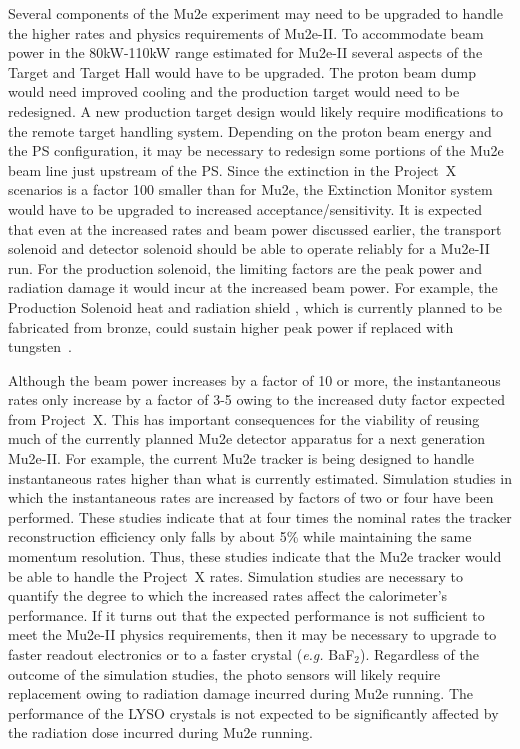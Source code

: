%

Several components of the Mu2e experiment may need to be upgraded to
handle the higher rates and physics requirements of Mu2e-II.  To
accommodate beam power in the 80kW-110kW range estimated for Mu2e-II
several aspects of the Target and Target Hall would have to be
upgraded.  The proton beam dump would need improved cooling and the
production target would need to be redesigned.  A new production
target design would likely require modifications to the remote target
handling system.  Depending on the proton beam energy and the PS
configuration, it may be necessary to redesign some portions of the
Mu2e beam line just upstream of the PS. Since the extinction in the
Project~X scenarios is a factor 100 smaller than for Mu2e, the
Extinction Monitor system would have to be upgraded to increased
acceptance/sensitivity.  It is expected that even at the increased
rates and beam power discussed earlier, the transport solenoid and
detector solenoid should be able to operate reliably for a Mu2e-II
run. For the production solenoid, the limiting factors are the peak
power and radiation damage it would incur at the increased beam power.
For example, the Production Solenoid heat and radiation shield , which
is currently planned to be fabricated from bronze, could sustain
higher peak power if replaced with tungsten~\cite{Mu2eII}.

Although the beam power increases by a factor of 10 or more, the
instantaneous rates only increase by a factor of 3-5 owing to the
increased duty factor expected from Project~X.  This has important
consequences for the viability of reusing much of the currently
planned Mu2e detector apparatus for a next generation Mu2e-II.  For
example, the current Mu2e tracker is being designed to handle
instantaneous rates higher than what is currently estimated.
Simulation studies in which the instantaneous rates are increased by
factors of two or four have been performed.  These studies indicate
that at four times the nominal rates the tracker reconstruction
efficiency only falls by about 5\% while maintaining the same momentum
resolution.  Thus, these studies indicate that the Mu2e tracker would
be able to handle the Project~X rates.  Simulation studies are
necessary to quantify the degree to which the increased rates affect
the calorimeter's performance.  If it turns out that the expected
performance is not sufficient to meet the Mu2e-II physics
requirements, then it may be necessary to upgrade to faster readout
electronics or to a faster crystal ({\it e.g.} BaF$_2$).  Regardless of the
outcome of the simulation studies, the photo sensors will likely
require replacement owing to radiation damage incurred during Mu2e
running.  The performance of the LYSO crystals is not expected to be
significantly affected by the radiation dose incurred during Mu2e
running.

